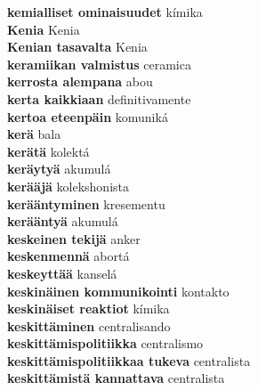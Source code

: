\textbf{ kemialliset ominaisuudet  } kímika \\
\textbf{ Kenia  } Kenia \\
\textbf{ Kenian tasavalta  } Kenia \\
\textbf{ keramiikan valmistus  } ceramica \\
\textbf{ kerrosta alempana  } abou \\
\textbf{ kerta kaikkiaan  } definitivamente \\
\textbf{ kertoa eteenpäin  } komuniká \\
\textbf{ kerä  } bala \\
\textbf{ kerätä  } kolektá \\
\textbf{ keräytyä  } akumulá \\
\textbf{ kerääjä  } kolekshonista \\
\textbf{ kerääntyminen  } kresementu \\
\textbf{ kerääntyä  } akumulá \\
\textbf{ keskeinen tekijä  } anker \\
\textbf{ keskenmennä  } abortá \\
\textbf{ keskeyttää  } kanselá \\
\textbf{ keskinäinen kommunikointi  } kontakto \\
\textbf{ keskinäiset reaktiot  } kímika \\
\textbf{ keskittäminen  } centralisando \\
\textbf{ keskittämispolitiikka  } centralismo \\
\textbf{ keskittämispolitiikkaa tukeva  } centralista \\
\textbf{ keskittämistä kannattava  } centralista \\

